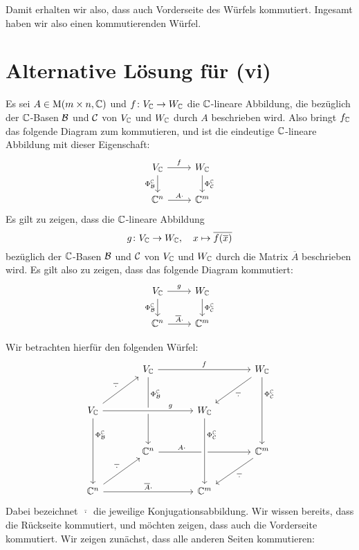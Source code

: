 \documentclass[a4paper,10pt]{article}
\begin{document}
Damit erhalten wir also, dass auch Vorderseite des Würfels kommutiert.
Ingesamt haben wir also einen kommutierenden Würfel.










\section{Alternative Lösung für (vi)}

Es sei $A \in \operatorname{M}(m \times n, \mathbb{C})$ und $f \colon V_{\mathbb{C}} \to W_{\mathbb{C}}$ die $\mathbb{C}$-lineare Abbildung, die bezüglich der $\mathbb{C}$-Basen $\mathcal{B}$ und $\mathcal{C}$ von $V_{\mathbb{C}}$ und $W_{\mathbb{C}}$ durch $A$ beschrieben wird.
Also bringt $f_{\mathbb{C}}$ das folgende Diagram zum kommutieren, und ist die eindeutige $\mathbb{C}$-lineare Abbildung mit dieser Eigenschaft:
\[
  \begin{tikzcd}
      V_\Cbb
      \arrow[r, "f"]
      \arrow[d, "\Phi^\Cbb_\mc{B}"']
    & W_\Cbb
      \arrow[d, "\Phi^\Cbb_\mc{C}"]
    \\
      \Cbb^n
      \arrow[r, "A \cdot"]
    & \Cbb^m
  \end{tikzcd}
\]
Es gilt zu zeigen, dass die $\mathbb{C}$-lineare Abbildung
\[
  g \colon V_{\mathbb{C}} \to W_{\mathbb{C}},
  \quad
  x \mapsto \overline{f(\overline{x})}
\]
bezüglich der $\mathbb{C}$-Basen $\mathcal{B}$ und $\mathcal{C}$ von $V_{\mathbb{C}}$ und $W_{\mathbb{C}}$ durch die Matrix $\overline{A}$ beschrieben wird.
Es gilt also zu zeigen, dass das folgende Diagram kommutiert:
\[
  \begin{tikzcd}
      V_\Cbb
      \arrow[r, "g"]
      \arrow[d, "\Phi^\Cbb_\mc{B}"']
    & W_\Cbb
      \arrow[d, "\Phi^\Cbb_\mc{C}"]
    \\
      \Cbb^n
      \arrow[r, "\overline{A} \cdot"]
    & \Cbb^m
  \end{tikzcd}
\]

Wir betrachten hierfür den folgenden Würfel:
\[
  \begin{tikzcd}[row sep = large, column sep = large]
      {}
    & V_\Cbb
      \arrow[rr, "f"]
      \arrow[dd, "\Phi^\Cbb_\mc{B}" near start]
    & {}
    & W_\Cbb
      \arrow[dl, "\overline{\,\cdot\,}"]
      \arrow[dd, "\Phi^\Cbb_\mc{C}" near start]
    \\
      V_\Cbb
      \arrow[ur, "\overline{\,\cdot\,}"]
      \arrow[rr, crossing over, "g" near end]
      \arrow[dd, "\Phi^\Cbb_\mc{B}" near start]
    & {}
    & W_\Cbb
    & {}
    \\
      {}
    & \Cbb^n
      \arrow[rr, "A \cdot" near start]
    & {}
    & \Cbb^m
      \arrow[dl, "\overline{\,\cdot\,}"]
    \\
      \Cbb^n
      \arrow[ur, "\overline{\,\cdot\,}"]
      \arrow[rr, "\overline{A} \cdot "]
    & {}
    & \Cbb^m
      \arrow[from=uu, crossing over, "\Phi^\Cbb_\mc{C}" near start]
    & {}
  \end{tikzcd}
\]
Dabei bezeichnet $\overline{\,\cdot\,}$ die jeweilige Konjugationsabbildung.
Wir wissen bereits, dass die Rückseite kommutiert, und möchten zeigen, dass auch die Vorderseite kommutiert.
Wir zeigen zunächst, dass alle anderen Seiten kommutieren:
\end{document}
